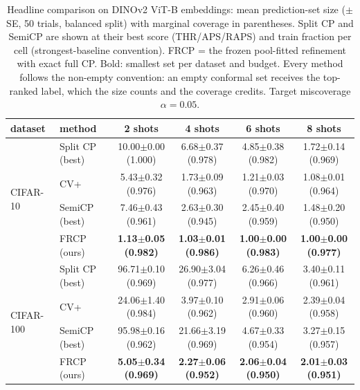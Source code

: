\begin{table}[t]
\centering
\small
\caption{Headline comparison on DINOv2 ViT-B embeddings: mean prediction-set size ($\pm$ SE, 50 trials, balanced split) with marginal coverage in parentheses. Split CP and SemiCP are shown at their best score (THR/APS/RAPS) and train fraction per cell (strongest-baseline convention). FRCP = the frozen pool-fitted refinement with exact full CP. Bold: smallest set per dataset and budget. Every method follows the non-empty convention: an empty conformal set receives the top-ranked label, which the size counts and the coverage credits. Target miscoverage $\alpha=0.05$.}
\label{tab:headline-appendix-a005}
\begin{tabular}{llcccc}
\toprule
dataset & method & 2 shots & 4 shots & 6 shots & 8 shots\\
\midrule
\multirow{4}{*}{CIFAR-10} & Split CP (best) & 10.00$\pm$0.00 {\scriptsize(1.000)} & 6.68$\pm$0.37 {\scriptsize(0.978)} & 4.85$\pm$0.38 {\scriptsize(0.982)} & 1.72$\pm$0.14 {\scriptsize(0.969)}\\
 & CV+ & 5.43$\pm$0.32 {\scriptsize(0.976)} & 1.73$\pm$0.09 {\scriptsize(0.963)} & 1.21$\pm$0.03 {\scriptsize(0.970)} & 1.08$\pm$0.01 {\scriptsize(0.964)}\\
 & SemiCP (best) & 7.46$\pm$0.43 {\scriptsize(0.961)} & 2.63$\pm$0.30 {\scriptsize(0.945)} & 2.45$\pm$0.40 {\scriptsize(0.959)} & 1.48$\pm$0.20 {\scriptsize(0.950)}\\
 & FRCP (ours) & \textbf{1.13$\pm$0.05 {\scriptsize(0.982)}} & \textbf{1.03$\pm$0.01 {\scriptsize(0.986)}} & \textbf{1.00$\pm$0.00 {\scriptsize(0.983)}} & \textbf{1.00$\pm$0.00 {\scriptsize(0.977)}}\\
\midrule
\multirow{4}{*}{CIFAR-100} & Split CP (best) & 96.71$\pm$0.10 {\scriptsize(0.969)} & 26.90$\pm$3.04 {\scriptsize(0.977)} & 6.26$\pm$0.46 {\scriptsize(0.966)} & 3.40$\pm$0.11 {\scriptsize(0.961)}\\
 & CV+ & 24.06$\pm$1.40 {\scriptsize(0.984)} & 3.97$\pm$0.10 {\scriptsize(0.962)} & 2.91$\pm$0.06 {\scriptsize(0.960)} & 2.39$\pm$0.04 {\scriptsize(0.958)}\\
 & SemiCP (best) & 95.98$\pm$0.16 {\scriptsize(0.962)} & 21.66$\pm$3.19 {\scriptsize(0.969)} & 4.67$\pm$0.33 {\scriptsize(0.954)} & 3.27$\pm$0.15 {\scriptsize(0.957)}\\
 & FRCP (ours) & \textbf{5.05$\pm$0.34 {\scriptsize(0.969)}} & \textbf{2.27$\pm$0.06 {\scriptsize(0.952)}} & \textbf{2.06$\pm$0.04 {\scriptsize(0.950)}} & \textbf{2.01$\pm$0.03 {\scriptsize(0.951)}}\\

\end{tabular}
\end{table}
